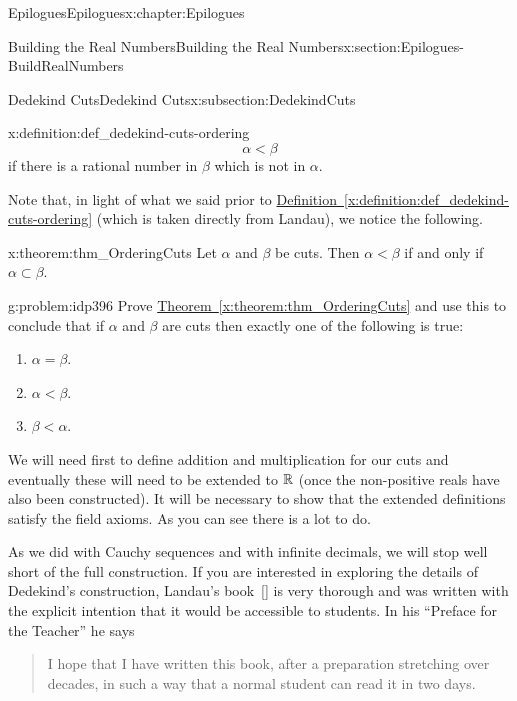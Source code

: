 \begin{chapterptx}{Epilogues}{}{Epilogues}{}{}{x:chapter:Epilogues}
\begin{sectionptx}{Building the Real Numbers}{}{Building the Real Numbers}{}{}{x:section:Epilogues-BuildRealNumbers}
\begin{subsectionptx}{Dedekind Cuts}{}{Dedekind Cuts}{}{}{x:subsection:DedekindCuts}
\begin{definition}{}{x:definition:def_dedekind-cuts-ordering}
				\begin{equation*}
					\alpha\lt \beta
				\end{equation*}
				if there is a rational number in \(\beta\) which is not in \(\alpha\).%
			\end{definition}
			Note that, in light of what we said prior to \hyperref[x:definition:def_dedekind-cuts-ordering]{Definition~{\xreffont\ref{x:definition:def_dedekind-cuts-ordering}}} (which is taken directly from Landau), we notice the following.%
			\begin{theorem}{}{}{x:theorem:thm_OrderingCuts}%
				 Let \(\alpha\) and \(\beta\) be cuts. Then \(\alpha\lt \beta\) if and only if \(\alpha\subset\beta\).%
			\end{theorem}
			\begin{problem}{}{g:problem:idp396}%
				 Prove \hyperref[x:theorem:thm_OrderingCuts]{Theorem~{\xreffont\ref{x:theorem:thm_OrderingCuts}}} and use this to conclude that if \(\alpha\) and \(\beta\) are cuts then exactly one of the following is true:%
				\begin{enumerate}
					\item{}\(\alpha=\beta\).%
					\item{}\(\alpha\lt \beta\).%
					\item{}\(\beta\lt \alpha\).%
				\end{enumerate}
			\end{problem}
			We will need first to define addition and multiplication for our cuts and eventually these will need to be extended to \(\mathbb {R}\) (once the non-positive reals have also been constructed). It will be necessary to show that the extended definitions satisfy the field axioms. As you can see there is a lot to do.%
			\par
			As we did with Cauchy sequences and with infinite decimals, we will stop well short of the full construction. If you are interested in  exploring the details of Dedekind's construction, Landau's book~\hyperlink{x:biblio:landau66__found_analy}{[{}]} is very thorough and was written with the explicit intention that it would be accessible to students. In his ``Preface for the Teacher'' he says%
			\begin{quote}%
				I hope that I have written this book, after a preparation stretching over decades, in such a way that a normal student can read it in two days.%

\end{quote}
\end{subsectionptx}
\end{sectionptx}
\end{chapterptx}
